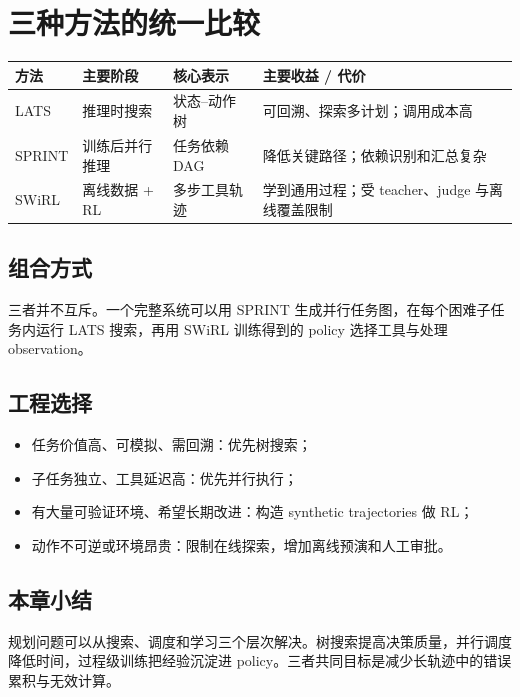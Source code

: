 \section{三种方法的统一比较}

\begin{table}[H]
\centering
\small
\begin{tabular}{>{\raggedright\arraybackslash}p{2.2cm}>{\raggedright\arraybackslash}p{3.4cm}>{\raggedright\arraybackslash}p{3.4cm}>{\raggedright\arraybackslash}p{4.2cm}}
\toprule
\textbf{方法} & \textbf{主要阶段} & \textbf{核心表示} & \textbf{主要收益 / 代价} \\
\midrule
LATS & 推理时搜索 & 状态--动作树 & 可回溯、探索多计划；调用成本高 \\
SPRINT & 训练后并行推理 & 任务依赖 DAG & 降低关键路径；依赖识别和汇总复杂 \\
SWiRL & 离线数据 + RL & 多步工具轨迹 & 学到通用过程；受 teacher、judge 与离线覆盖限制 \\
\bottomrule
\end{tabular}
\end{table}

\subsection{组合方式}

三者并不互斥。一个完整系统可以用 SPRINT 生成并行任务图，在每个困难子任务内运行 LATS 搜索，再用 SWiRL 训练得到的 policy 选择工具与处理 observation。

\subsection{工程选择}

\begin{itemize}
    \item 任务价值高、可模拟、需回溯：优先树搜索；
    \item 子任务独立、工具延迟高：优先并行执行；
    \item 有大量可验证环境、希望长期改进：构造 synthetic trajectories 做 RL；
    \item 动作不可逆或环境昂贵：限制在线探索，增加离线预演和人工审批。
\end{itemize}

\subsection{本章小结}

规划问题可以从搜索、调度和学习三个层次解决。树搜索提高决策质量，并行调度降低时间，过程级训练把经验沉淀进 policy。三者共同目标是减少长轨迹中的错误累积与无效计算。

